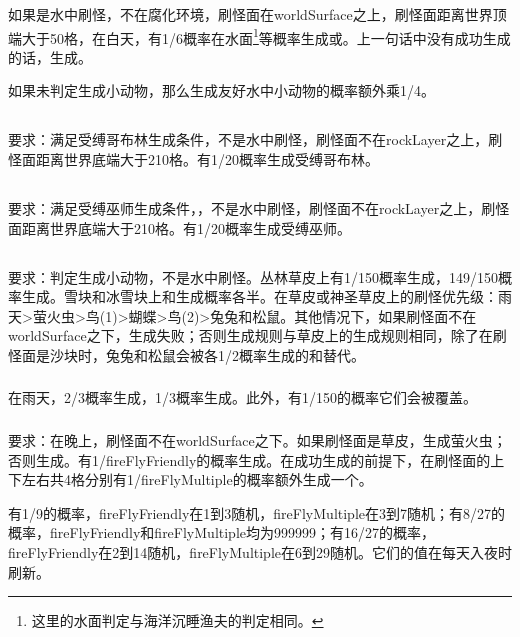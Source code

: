 如果是水中刷怪，不在腐化环境，刷怪面在worldSurface之上，刷怪面距离世界顶端大于50格，在白天，有1/6概率在水面\footnote{这里的水面判定与海洋沉睡渔夫的判定相同。}等概率生成或。上一句话中没有成功生成的话，生成。

如果未判定生成小动物，那么生成友好水中小动物的概率额外乘1/4。

\subsection{}
要求：满足受缚哥布林生成条件，不是水中刷怪，刷怪面不在rockLayer之上，刷怪面距离世界底端大于210格。有1/20概率生成受缚哥布林。

\subsection{}
要求：满足受缚巫师生成条件，，不是水中刷怪，刷怪面不在rockLayer之上，刷怪面距离世界底端大于210格。有1/20概率生成受缚巫师。

\subsection{}
要求：判定生成小动物，不是水中刷怪。丛林草皮上有1/150概率生成，149/150概率生成。雪块和冰雪块上和生成概率各半。在草皮或神圣草皮上的刷怪优先级：雨天>萤火虫>鸟(1)>蝴蝶>鸟(2)>兔兔和松鼠。其他情况下，如果刷怪面不在worldSurface之下，生成失败；否则生成规则与草皮上的生成规则相同，除了在刷怪面是沙块时，兔兔和松鼠会被各1/2概率生成的和替代。

\subsubsection{}
在雨天，2/3概率生成，1/3概率生成。此外，有1/150的概率它们会被覆盖。

\subsubsection{}\label{app14}
要求：在晚上，刷怪面不在worldSurface之下。如果刷怪面是草皮，生成萤火虫；否则生成。有1/fireFlyFriendly的概率生成。在成功生成的前提下，在刷怪面的上下左右共4格分别有1/fireFlyMultiple的概率额外生成一个。

有1/9的概率，fireFlyFriendly在1到3随机，fireFlyMultiple在3到7随机；有8/27的概率，fireFlyFriendly和fireFlyMultiple均为999999；有16/27的概率，fireFlyFriendly在2到14随机，fireFlyMultiple在6到29随机。它们的值在每天入夜时刷新。

